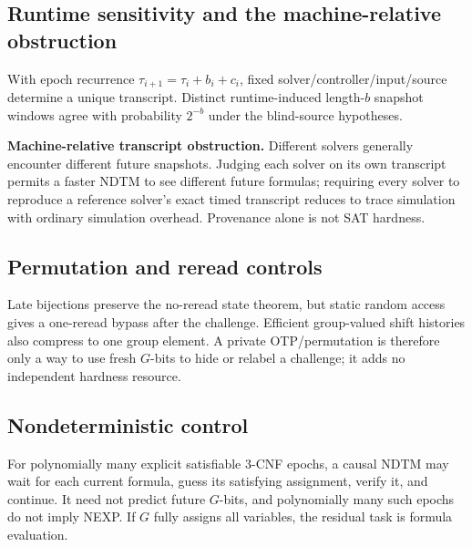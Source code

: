 \documentclass[11pt]{article}
\begin{document}
\subsection{Runtime sensitivity and the machine-relative obstruction}
With epoch recurrence \(\tau_{i+1}=\tau_i+b_i+c_i\), fixed solver/controller/input/source
determine a unique transcript. Distinct runtime-induced length-\(b\) snapshot windows agree
with probability \(2^{-b}\) under the blind-source hypotheses.

\begin{warningbox}
\textbf{Machine-relative transcript obstruction.} Different solvers generally encounter different
future snapshots. Judging each solver on its own transcript permits a faster NDTM to see different
future formulas; requiring every solver to reproduce a reference solver's exact timed transcript
reduces to trace simulation with ordinary simulation overhead. Provenance alone is not SAT hardness.
\end{warningbox}

\subsection{Permutation and reread controls}
Late bijections preserve the no-reread state theorem, but static random access gives a one-reread
bypass after the challenge. Efficient group-valued shift histories also compress to one group
element. A private OTP/permutation is therefore only a way to use fresh \(G\)-bits to hide or
relabel a challenge; it adds no independent hardness resource.

\subsection{Nondeterministic control}
\begin{warningbox}
For polynomially many explicit satisfiable 3-CNF epochs, a causal NDTM may wait for each current
formula, guess its satisfying assignment, verify it, and continue. It need not predict future
\(G\)-bits, and polynomially many such epochs do not imply NEXP. If \(G\) fully assigns
all variables, the residual task is formula evaluation.
\end{warningbox}
\end{document}
